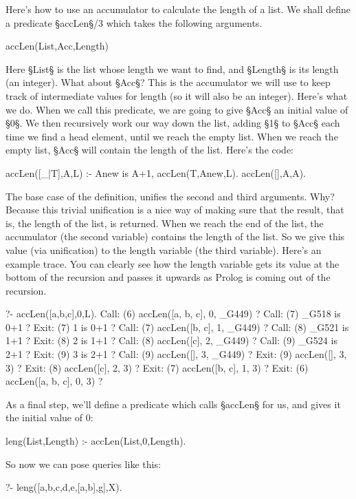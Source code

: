 Here's how to use an accumulator to calculate the length of a list.
We shall define a predicate §accLen§/3 which takes the following
arguments.
\begin{LPNcodedisplay}
accLen(List,Acc,Length)
\end{LPNcodedisplay}
Here §List§ is the list whose length we want to find, and §Length§ is
its length (an integer).  What about §Acc§?  This is the accumulator
we will use to keep track of intermediate values for length (so it
will also be an integer).  Here's what we do.  When we call this
predicate, we are going to give §Acc§ an initial value of §0§.  We
then recursively work our way down the list, adding §1§ to §Acc§ each
time we find a head element, until we reach the empty list.  When we
reach the empty list, §Acc§ will contain the length of the list.
Here's the code:
\begin{LPNcodedisplay}
accLen([_|T],A,L) :-  Anew is A+1, accLen(T,Anew,L).
accLen([],A,A).
\end{LPNcodedisplay}

The base case of the definition, unifies the second and third
arguments.  Why?  Because this trivial unification is a nice way of
making sure that the result, that is, the length of the list, is
returned. When we reach the end of the list, the accumulator (the
second variable) contains the length of the list.  So we give this
value (via unification) to the length variable (the third variable).
Here's an example trace. You can clearly see how the length variable
gets its value at the bottom of the recursion and passes it upwards as
Prolog is coming out of the recursion.
\begin{LPNcodedisplay}
?- accLen([a,b,c],0,L).
   Call: (6) accLen([a, b, c], 0, _G449) ?
   Call: (7) _G518 is 0+1 ?
   Exit: (7) 1 is 0+1 ?
   Call: (7) accLen([b, c], 1, _G449) ?
   Call: (8) _G521 is 1+1 ?
   Exit: (8) 2 is 1+1 ?
   Call: (8) accLen([c], 2, _G449) ?
   Call: (9) _G524 is 2+1 ?
   Exit: (9) 3 is 2+1 ?
   Call: (9) accLen([], 3, _G449) ?
   Exit: (9) accLen([], 3, 3) ?
   Exit: (8) accLen([c], 2, 3) ?
   Exit: (7) accLen([b, c], 1, 3) ?
   Exit: (6) accLen([a, b, c], 0, 3) ?
\end{LPNcodedisplay}

As a final step, we'll define a predicate which calls §accLen§
for us, and gives it the initial value of 0:
\begin{LPNcodedisplay}
leng(List,Length) :- accLen(List,0,Length).
\end{LPNcodedisplay}
So now we can pose queries like this:
\begin{LPNcodedisplay}
?- leng([a,b,c,d,e,[a,b],g],X).
\end{LPNcodedisplay}


